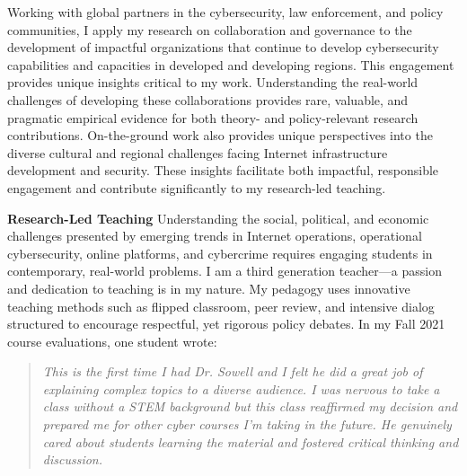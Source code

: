 \documentclass[11pt]{letter}
\begin{document}
\begin{letter}
%

%
Working with global partners in the cybersecurity, law enforcement, and policy communities, I apply my research on collaboration and governance to the development of impactful organizations that continue to develop cybersecurity capabilities and capacities in developed and developing regions. 
%
This engagement provides unique insights critical to my work.
%
Understanding the real-world challenges of developing these collaborations provides rare, valuable, and pragmatic empirical evidence for both theory- and policy-relevant research contributions.
%
%
%
%
%
%
On-the-ground work also provides unique perspectives into the diverse cultural and regional challenges facing Internet infrastructure development and security.
%
These insights facilitate both impactful, responsible engagement and contribute significantly to my research-led teaching.


\textbf{Research-Led Teaching} \vspace{0.2 \baselineskip} \newline %
%
Understanding the social, political, and economic challenges presented by emerging trends in Internet operations, operational cybersecurity, online platforms, and cybercrime requires engaging students in contemporary, real-world problems.
%
I am a third generation teacher---a passion and dedication to teaching is in my nature.
%
My pedagogy uses innovative teaching methods such as flipped classroom, peer review, and intensive dialog structured to encourage respectful, yet rigorous policy debates.
%
In my Fall 2021 course evaluations, one student wrote:
%
\begin{quote}
  \emph{This is the first time I had Dr. Sowell and I felt he did a great job of explaining complex topics to a diverse audience. I was nervous to take a class without a STEM background but this class reaffirmed my decision and prepared me for other cyber courses I'm taking in the future. He genuinely cared about students learning the material and fostered critical thinking and discussion.}
\end{quote}



\end{letter}
\end{document}
